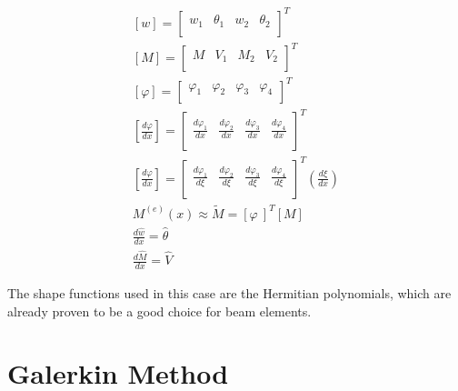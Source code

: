 \documentclass{article}
\begin{document}
\begin{equation}\label{eq:vectors_B}
    \begin{gathered}
        \left[w\right]=\left[\begin{matrix}w_1&\theta_1&w_2&\theta_2\\\end{matrix}\right]^T\\
       \left[M\right]=\left[\begin{matrix}M&V_1&M_2&V_2\\\end{matrix}\right]^T\\
       \left[\varphi\right]=\left[\begin{matrix}\varphi_1&\varphi_2&\varphi_3&\varphi_4\\\end{matrix}\right]^T\\
        \left[\frac{d\varphi}{dx}\right]=\left[\begin{matrix}\frac{d\varphi_1}{dx}&\frac{d\varphi_2}{dx}&\frac{d\varphi_3}{dx}&\frac{d\varphi_4}{dx}\\\end{matrix}\right]^T\\
        \left[\frac{d\varphi}{dx}\right]=\left[\begin{matrix}\frac{d\varphi_1}{d\xi}&\frac{d\varphi_2}{d\xi}&\frac{d\varphi_3}{d\xi}&\frac{d\varphi_4}{d\xi}\\\end{matrix}\right]^T\left(\frac{d\xi}{dx}\right)\\
        M^{(e)}\left(x\right)\approx\tilde{M}=\left[\varphi\ \right]^T\left[M\right]\\
        \frac{d\hat{w}}{dx}=\hat{\theta}\\
        \frac{d\hat{M}}{dx}=\hat{V}
    \end{gathered}
\end{equation}

The shape functions used in this case are the Hermitian polynomials, which are already proven to be a good choice for beam elements.

\section{Galerkin Method}
\end{document}

